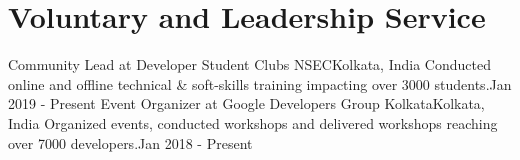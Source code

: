 \documentclass[../../main.tex]{subfiles}
\begin{document}
    \section{Voluntary and Leadership Service}
        \resumeSubHeadingListStart
            \resumeSubheading
            {Community Lead at Developer Student Clubs NSEC}{Kolkata, India}
            {Conducted online and offline technical \& soft-skills training impacting over 3000 students.}{Jan 2019 - Present}
            \resumeSubheading
            {Event Organizer at Google Developers Group Kolkata}{Kolkata, India}
            {Organized events, conducted workshops and delivered workshops reaching over 7000 developers.}{Jan 2018 - Present}
        \resumeSubHeadingListEnd
        \vspace{-5pt}
\end{document}
